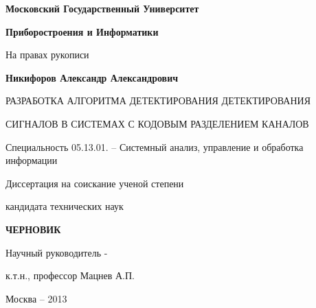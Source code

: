\noindent\centerline{\bf{Московский Государственный Университет}}
\noindent\centerline{\bf{Приборостроения и Информатики}}
\vspace{\baselineskip}
\vspace{\baselineskip}
\vspace{\baselineskip}

\hfill На правах рукописи

\vspace{\baselineskip}
\vspace{\baselineskip}
\vspace{\baselineskip}
\vspace{\baselineskip}

\noindent\centerline{\bf{Никифоров Александр Александрович}}

\vspace{\baselineskip}
\vspace{\baselineskip}
\vspace{\baselineskip}
\vspace{\baselineskip}

\noindent\centerline{РАЗРАБОТКА АЛГОРИТМА ДЕТЕКТИРОВАНИЯ ДЕТЕКТИРОВАНИЯ}
\noindent\centerline{СИГНАЛОВ В СИСТЕМАХ С КОДОВЫМ РАЗДЕЛЕНИЕМ КАНАЛОВ}

\vspace{\baselineskip}
\vspace{\baselineskip}
\vspace{\baselineskip}
\vspace{\baselineskip}

\noindent\centerline{Специальность 05.13.01. – Системный анализ, управление и обработка информации}

\vspace{\baselineskip}
\vspace{\baselineskip}
\vspace{\baselineskip}
\vspace{\baselineskip}

\noindent\centerline{Диссертация на соискание ученой степени}
\noindent\centerline{кандидата технических наук}


\vspace{\baselineskip}
\vspace{\baselineskip}
\vspace{\baselineskip}
\vspace{\baselineskip}
\noindent\centerline{\bf{ЧЕРНОВИК}}

\vspace{\baselineskip}
\vspace{\baselineskip}
\vspace{\baselineskip}

\hfill{Научный руководитель -}

\hfill{к.т.н., профессор Мацнев А.П.}

\vfill
\noindent\centerline{Москва – 2013}

\newpage

